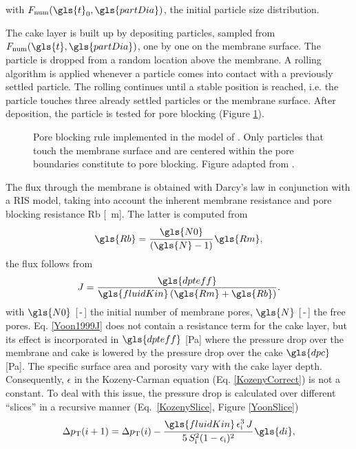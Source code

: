 with $F_{\mathrm{num}}(\gls{t}_\mathrm{0},\gls{partDia})$, the initial particle size distribution. \par
The cake layer is built up by depositing particles, 
sampled from $F_{\mathrm{num}}(\gls{t},\gls{partDia})$, one by one on the membrane surface. The particle is dropped from a random location above the membrane. A rolling algorithm is applied whenever a particle comes into contact with a previously settled particle. The rolling continues until a stable position is reached, i.e. the particle touches three already settled particles or the membrane surface. After deposition, the particle is tested for pore blocking (Figure \ref{poreBlock}).  
\begin{figure}[H]
\begin{center}
\def\svgwidth{0.6\columnwidth}

\caption{Pore blocking rule implemented in the model of \cite{Yoon1999}. Only particles that touch the membrane surface and are centered within the pore boundaries constitute to pore blocking. Figure adapted from \cite{Yoon1999}. \label{poreBlock}}
\end{center}
\end{figure}

The flux through the membrane is obtained with Darcy's law in conjunction with a \gls{RIS} model, taking into account the inherent membrane resistance and pore blocking resistance \gls{Rb} [\unit{\reciprocal\metre}]. The latter is computed from  
\begin{equation}
\gls{Rb}= \cfrac{\gls{N0}}{(\gls{N}-1)} \, \gls{Rm} ,
\label{Yoon1999Rb}
\end{equation}
the flux follows from
\begin{equation}
J=\frac{\gls{dpteff}}{\gls{fluidKin} \, (\gls{Rm}+\gls{Rb})} .
\label{Yoon1999J}
\end{equation}
with $\gls{N0}$ [\,-\,] the initial number of membrane pores, $\gls{N}$ [\,-\,] the free pores.
Eq. \eqref{Yoon1999J} does not contain a resistance term for the cake layer, but its effect is incorporated in $\gls{dpteff}$ [\unit{\pascal}] where the pressure drop over the membrane and cake is lowered by the pressure drop over the cake $\gls{dpc}$ [\unit{\pascal}].
The specific surface area and porosity vary with the cake layer depth. Consequently, $\epsilon$ in the Kozeny-Carman equation (Eq. \eqref{KozenyCorrect}) is not a constant. To deal with this issue, the pressure drop is calculated over different ``slices'' in a recursive manner (Eq.\ \eqref{KozenySlice}, Figure \ref{YoonSlice})
\begin{equation}
\Delta p_{\mathrm{T}}(i+1) =\Delta p_\mathrm{{T}}(i) - \cfrac{\gls{fluidKin}\, \epsilon_{\mathrm{i}}^3 \, J}{5 \, S_{\mathrm{i}}^{2}(1-\epsilon_{\mathrm{i}})^{2}} \, \gls{di},
\label{KozenySlice}
\end{equation}

